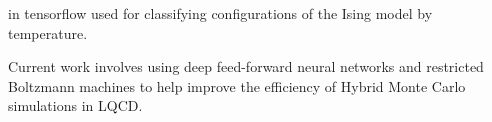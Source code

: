 \begin{cventries}
{\begin{cvitems}
{                  in tensorflow used for classifying configurations of the Ising
                  model by temperature.}
          \item {Current work involves using deep feed-forward neural
                  networks and restricted Boltzmann machines to help improve
                  the efficiency of Hybrid Monte Carlo simulations in LQCD.}
      \end{cvitems}
  }
\end{cventries}




